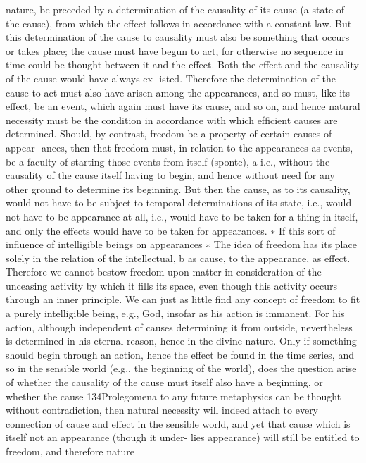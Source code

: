 nature, be preceded by a determination of the causality of its cause (a
state of the cause), from which the effect follows in accordance with a
constant law. But this determination of the cause to causality must also
be something that occurs or takes place; the cause must have begun to act,
for otherwise no sequence in time could be thought between it and the
effect. Both the effect and the causality of the cause would have always ex-
isted. Therefore the determination of the cause to act must also have arisen
among the appearances, and so must, like its effect, be an event, which
again must have its cause, and so on, and hence natural necessity must be
the condition in accordance with which efﬁcient causes are determined.
Should, by contrast, freedom be a property of certain causes of appear-
ances, then that freedom must, in relation to the appearances as events,
be a faculty of starting those events from itself (sponte), a i.e., without the
causality of the cause itself having to begin, and hence without need for
any other ground to determine its beginning. But then the cause, as to its
causality, would not have to be subject to temporal determinations of its
state, i.e., would not have to be appearance at all, i.e., would have to be
taken for a thing in itself, and only the effects would have to be taken for
appearances. ∗ If this sort of inﬂuence of intelligible beings on appearances
∗
The idea of freedom has its place solely in the relation of the intellectual, b as
cause, to the appearance, as effect. Therefore we cannot bestow freedom upon
matter in consideration of the unceasing activity by which it ﬁlls its space,
even though this activity occurs through an inner principle. We can just as
little ﬁnd any concept of freedom to ﬁt a purely intelligible being, e.g., God,
insofar as his action is immanent. For his action, although independent of
causes determining it from outside, nevertheless is determined in his eternal
reason, hence in the divine nature. Only if something should begin through an
action, hence the effect be found in the time series, and so in the sensible
world (e.g., the beginning of the world), does the question arise of whether the
causality of the cause must itself also have a beginning, or whether the cause
134Prolegomena to any future metaphysics
can be thought without contradiction, then natural necessity will indeed
attach to every connection of cause and effect in the sensible world,
and yet that cause which is itself not an appearance (though it under-
lies appearance) will still be entitled to freedom, and therefore nature
